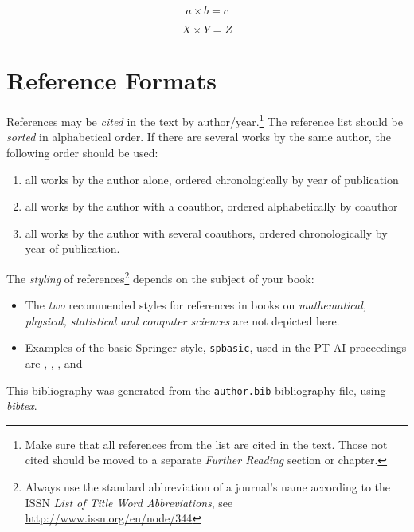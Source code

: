 \documentclass[graybox]{svmult}
\begin{document}
\begin{equation}
a \times b = c
\end{equation}

\begin{equation}
X \times Y = Z
\end{equation}

\section{Reference Formats}

References may be \textit{cited} in the text by author/year.\footnote{Make
sure that all references from the list are cited in the text.
Those not cited should be moved to a separate \textit{Further Reading}
section or chapter.}
The reference list should be \textit{sorted} in alphabetical order.
If there are several works by the same author, the following order should be used:
\begin{enumerate}
\item all works by the author alone, ordered chronologically by year of publication
\item all works by the author with a coauthor, ordered alphabetically by coauthor
\item all works by the author with several coauthors, ordered chronologically by year of publication.
\end{enumerate}
The \textit{styling} of references\footnote{Always use the standard abbreviation of a journal's name according to the ISSN \textit{List of Title Word Abbreviations}, see \url{http://www.issn.org/en/node/344}}
depends on the subject of your book:
\begin{itemize}
\item The \textit{two} recommended styles for references in books on \textit{mathematical, physical, statistical and computer sciences} are
not depicted here.
\item Examples of the basic Springer style, \texttt{spbasic},
used in the PT-AI proceedings
are \cite{calfee-1991}, \cite{dod-1999}, \cite{harris-et-al}, and
\cite{oneil-et-al}
\end{itemize}

%

%

\small



 This bibliography was generated from the \texttt{author.bib}
bibliography file, using {\em bibtex}.
\end{document}
